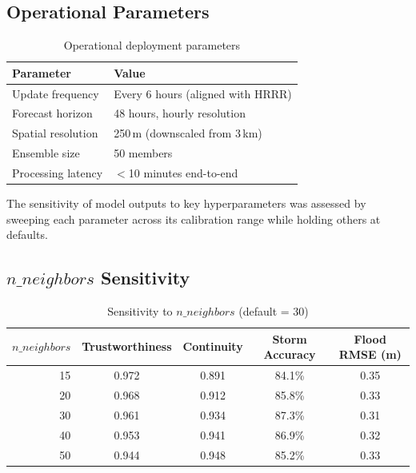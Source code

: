 \documentclass{article}
\begin{document}
\subsection{Operational Parameters}
\begin{table}[H]
\centering
\begin{tabular}{ll}
    \toprule
    \textbf{Parameter} & \textbf{Value} \\
    \midrule
    Update frequency     & Every 6 hours (aligned with HRRR) \\
    Forecast horizon     & 48 hours, hourly resolution \\
    Spatial resolution   & 250\,m (downscaled from 3\,km) \\
    Ensemble size        & 50 members \\
    Processing latency   & $<$10 minutes end-to-end \\
    \bottomrule
\end{tabular}
\caption{Operational deployment parameters}
\label{tab:operational}
\end{table}

\mkmsensitivity

The sensitivity of model outputs to key hyperparameters was assessed by sweeping each
parameter across its calibration range while holding others at defaults.

\subsection{$n\_neighbors$ Sensitivity}

\begin{table}[H]
\centering
\begin{tabular}{rcccc}
    \toprule
    $n\_neighbors$ & Trustworthiness & Continuity & Storm Accuracy & Flood RMSE (m) \\
    \midrule
    15 & 0.972 & 0.891 & 84.1\% & 0.35 \\
    20 & 0.968 & 0.912 & 85.8\% & 0.33 \\
    30 & 0.961 & 0.934 & 87.3\% & 0.31 \\
    40 & 0.953 & 0.941 & 86.9\% & 0.32 \\
    50 & 0.944 & 0.948 & 85.2\% & 0.33 \\
    \bottomrule
\end{tabular}
\caption{Sensitivity to $n\_neighbors$ (default = 30)}
\label{tab:sens_neighbors}
\end{table}
\end{document}
